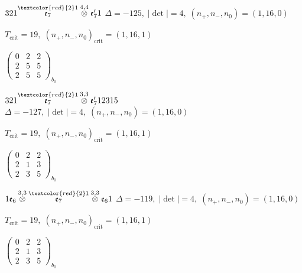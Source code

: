 \documentclass[10pt]{article}
\begin{document}
\smallskip

$321\overset{\textcolor{red}{2}1}{\mathfrak{e}_7}\overset{4,4}{\otimes}\mathfrak{e}_7'1$ \quad $\Delta=-125,\; |\det|=4,\; (n_+,n_-,n_0)=(1,16,0)$

\hspace{1em}$T_{\text{crit}}=19,\; (n_+,n_-,n_0)_{\text{crit}}=(1,16,1)$

\hspace{2em}$\left(\begin{smallmatrix}0 & 2 & 2 \\ 2 & 5 & 5 \\ 2 & 5 & 5\end{smallmatrix}\right)_{\!b_0}$

\smallskip

$321\overset{\textcolor{red}{2}1}{\mathfrak{e}_7}\overset{3,3}{\otimes}\mathfrak{e}_7'12315$ \quad $\Delta=-127,\; |\det|=4,\; (n_+,n_-,n_0)=(1,16,0)$

\hspace{1em}$T_{\text{crit}}=19,\; (n_+,n_-,n_0)_{\text{crit}}=(1,16,1)$

\hspace{2em}$\left(\begin{smallmatrix}0 & 2 & 2 \\ 2 & 1 & 3 \\ 2 & 3 & 5\end{smallmatrix}\right)_{\!b_0}$

\smallskip

$1\mathfrak{e}_6\overset{3,3}{\otimes}\overset{\textcolor{red}{2}1}{\mathfrak{e}_7}\overset{3,3}{\otimes}\mathfrak{e}_61$ \quad $\Delta=-119,\; |\det|=4,\; (n_+,n_-,n_0)=(1,16,0)$

\hspace{1em}$T_{\text{crit}}=19,\; (n_+,n_-,n_0)_{\text{crit}}=(1,16,1)$

\hspace{2em}$\left(\begin{smallmatrix}0 & 2 & 2 \\ 2 & 1 & 3 \\ 2 & 3 & 5\end{smallmatrix}\right)_{\!b_0}$
\end{document}
